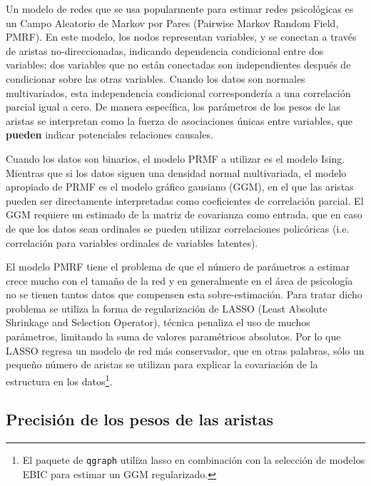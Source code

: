 \documentclass[11pt,spanish]{article}\usepackage[]{graphicx}\usepackage[]{color}
\begin{document}
Un modelo de redes que se usa popularmente para estimar redes psicológicas es un Campo Aleatorio de Markov por Pares (Pairwise Markov Random Field, PMRF). En este modelo, los nodos representan variables, y se conectan a través de aristas no-direccionadas, indicando dependencia condicional entre dos variables; dos variables que no están conectadas son independientes después de condicionar sobre las otras variables. Cuando los datos son normales multivariados, esta independencia condicional correspondería a una correlación parcial igual a cero. De manera específica, los parámetros de los pesos de las aristas se interpretan como la fuerza de asociaciones únicas entre variables, que {\bf pueden} indicar potenciales relaciones causales. 

Cuando los datos son binarios, el modelo PRMF a utilizar es el modelo Ising. Mientras que si los datos siguen una densidad normal multivariada, el modelo apropiado de PRMF es el modelo gráfico gausiano (GGM), en el que las aristas pueden ser directamente interpretadas como coeficientes de correlación parcial. El GGM requiere un estimado de la matriz de covarianza como entrada, que en caso de que los datos sean ordinales se pueden utilizar correlaciones policóricas (i.e. correlación para variables ordinales de variables latentes).

El modelo PMRF tiene el problema de que el número de parámetros a estimar crece mucho con el tamaño de la red y en generalmente en el área de psicología no se tienen tantos datos que compensen esta sobre-estimación. Para tratar dicho problema se utiliza la forma de regularización de LASSO (Least Absolute Shrinkage and Selection Operator), técnica penaliza el uso de muchos parámetros, limitando la suma de valores paramétricos absolutos. Por lo que LASSO regresa un modelo de red más conservador, que en otras palabras, sólo un pequeño número de aristas se utilizan para explicar la covariación de la estructura en los datos\footnote{El paquete de \texttt{qgraph} \citep{packageqgraph, bootnet} utiliza lasso en combinación con la selección de modelos EBIC para estimar un GGM regularizado.}. 


\subsection{Precisión de los pesos de las aristas}
\end{document}
